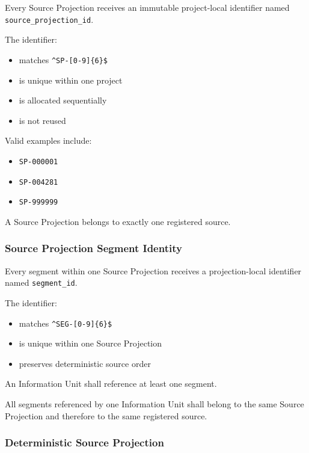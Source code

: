Every Source Projection receives an immutable project-local identifier named \texttt{source\_projection\_id}.

The identifier:

\begin{itemize}
\tightlist
\item
  matches \texttt{\^{}SP-{[}0-9{]}\{6\}\$}
\item
  is unique within one project
\item
  is allocated sequentially
\item
  is not reused
\end{itemize}

Valid examples include:

\begin{itemize}
\tightlist
\item
  \texttt{SP-000001}
\item
  \texttt{SP-004281}
\item
  \texttt{SP-999999}
\end{itemize}

A Source Projection belongs to exactly one registered source.

\hypertarget{source-projection-segment-identity}{%
\subsubsection{Source Projection Segment Identity}\label{source-projection-segment-identity}}

Every segment within one Source Projection receives a projection-local identifier named \texttt{segment\_id}.

The identifier:

\begin{itemize}
\tightlist
\item
  matches \texttt{\^{}SEG-{[}0-9{]}\{6\}\$}
\item
  is unique within one Source Projection
\item
  preserves deterministic source order
\end{itemize}

An Information Unit shall reference at least one segment.

All segments referenced by one Information Unit shall belong to the same Source Projection and therefore to the same registered source.

\hypertarget{deterministic-source-projection}{%
\subsubsection{Deterministic Source Projection}\label{deterministic-source-projection}}

